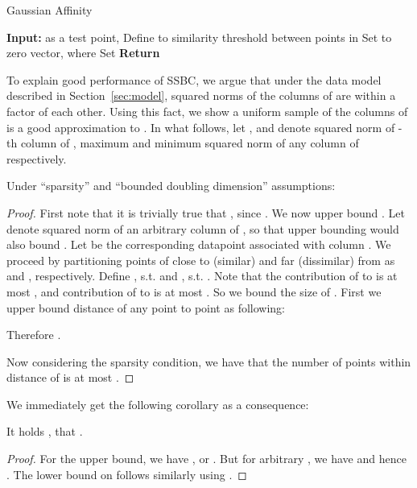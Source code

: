 \documentclass{sig-alternate}
\begin{document}
\begin{algorithm}
\caption{\label{alg:ha} Gaussian Affinity}
\begin{algorithmic}
\STATE \textbf{Input:}  as a test point, 
\STATE Define  to similarity threshold between points in 
\STATE Set  to zero vector, where 
\STATE Set 
  \STATE 
  \STATE 
\ENDFOR
\STATE \textbf{Return} 
\end{algorithmic}
\end{algorithm}

To explain good performance of SSBC, we argue that under the data model described in Section~\ref{sec:model}, squared norms of the columns of  are within a  factor of each other. Using this fact, we show a uniform sample of the columns of  is a good approximation to . In what follows, let ,  and  denote squared norm of -th column of , maximum and minimum squared norm of any column of  respectively.

\begin{lemma}
Under ``sparsity'' and ``bounded doubling dimension'' assumptions:

\end{lemma}
\begin{proof}
First note that it is trivially true that , since . We now upper bound . Let  denote squared norm of an arbitrary column of , so that upper bounding  would also bound . Let  be the corresponding datapoint associated with column .
We proceed by partitioning points of  close to (similar) and far (dissimilar) from  as  and , respectively.
Define , s.t.  and , s.t. . Note that the contribution of  to  is at most , and contribution of  to  is at most 
 . So we bound the size of . First we upper bound distance of any point  to point  as following:

Therefore .

Now considering the sparsity condition, we have that the number of points  within  distance of  is at most 
.
\end{proof}
We immediately get the following corollary as a consequence:
\begin{corollary}\label{cor:first}
It holds ,  that .
\end{corollary}
\begin{proof}
For the upper bound, we have , or . But for  arbitrary , we have  and hence . The lower bound on  follows similarly using .
\end{proof}
\end{document}
